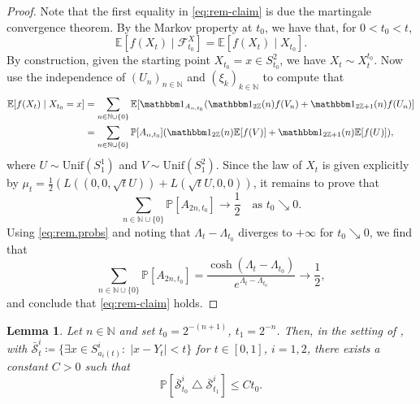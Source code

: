 \documentclass[12pt,oneside]{amsart}
\newtheorem{lemma}[theorem]{Lemma}
\theoremstyle{definition}
\newcommand{\N}{\mathbb N}
\newcommand{\Sccc}{\bar{\mathcal S}}
\def\P{{\mathbb P}}
\def\E{{\mathbb E}}
\numberwithin{equation}{section}
\begin{document}
\begin{proof}
	Note that the first equality in \eqref{eq:rem-claim} is due the martingale convergence theorem.
    By the Markov property at $t_0$, we have that, for $0 < t_0 < t$,
    \begin{equation}
        \E[f(X_{t}) \mid \mathcal F^X_{t_0} ] = \E[f(X_{t})\mid X_{t_0} ].
    \end{equation}
    By construction, given the starting point $X_{t_0} = x \in S_{t_0}^2$, we have $X_{t} \sim X_{t}^{t_0}$.
    Now use the independence of $(U_n)_{n \in \N}$ and $(\xi_k)_{k \in \N}$ to compute that
    \begin{align}
        \mathbb E[f(X_t) \mid X_{t_0} = x] &= \sum_{n \in \N \cup \{ 0 \}} \mathbb E[ \mathbbm 1_{A_{n,t_0}} ( \mathbbm 1_{2\mathbb Z}(n) f(V_n) + \mathbbm 1_{2\mathbb Z + 1}(n) f(U_n) ]
        \\
        &=\sum_{n \in \N \cup \{ 0 \} } \P[ A_{n,t_0} ] \!\left( \mathbbm 1_{2\mathbb Z}(n)\mathbb E[f(V)] + \mathbbm 1_{2\mathbb Z + 1}(n)\mathbb E[f(U)]\right)\!,
    \end{align}
    where $U \sim \text{Unif}(S^1_1)$ and $V \sim \text{Unif}(S^2_1)$.
    Since the law of $X_t$ is given explicitly by $\mu_t = \frac12 (L((0,0,\sqrt{t}U)) + L(\sqrt{t}U,0,0))$, it remains to prove that
    \begin{equation}
        \sum_{n \in \N \cup \{ 0 \}} \mathbb P[A_{2n,t_0}] \to \frac12\quad\mbox{as } t_0\searrow 0.
    \end{equation}
    Using \eqref{eq:rem.probs} and noting that $\Lambda_t - \Lambda_{t_0}$ diverges to $+\infty$ for $t_0 \searrow 0$, we find that
    \begin{equation}
        \sum_{n \in \N \cup \{ 0 \}} \mathbb P[A_{2n,t_0}] = \frac{\cosh(\Lambda_t - \Lambda_{t_0})}{e^{\Lambda_t - \Lambda_{t_0}}} \to \frac12,
    \end{equation}
    and conclude that \eqref{eq:rem-claim} holds.
\end{proof}

\begin{lemma}\label{lem:app-reg}
	Let $n \in \N$ and set $t_0 = 2^{-(n+1)}$, $t_1 = 2^{-n}$. Then, in the setting of , with $\Sccc^i_{t} \coloneqq \{\exists x \in S^i_{a_i(t)} \colon \; |x - Y_t| < t \}$ for $t \in [0, 1]$, $i = 1,2$, there exists a constant $C > 0$ such that
	   \begin{equation}
    	    \P[\Sccc^i_{t_0} \bigtriangleup \Sccc^i_{t_1}] \le C t_0.
	   \end{equation}
\end{lemma}
\end{document}

